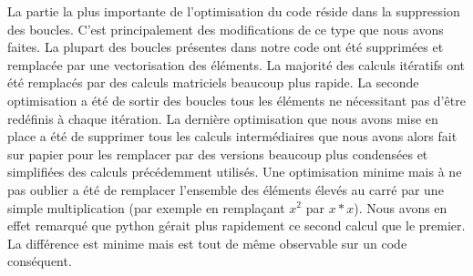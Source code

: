 \documentclass{article}
\begin{document}
		La partie la plus importante de l'optimisation du code réside dans la suppression des boucles. 
		C'est principalement des modifications de ce type que nous avons faites.
		La plupart des boucles présentes dans notre code ont été supprimées et remplacée par une vectorisation des éléments.
		La majorité des calculs itératifs ont été remplacés par des calculs matriciels beaucoup plus rapide.
		La seconde optimisation a été de sortir des boucles tous les éléments ne nécessitant pas d'être redéfinis à chaque itération.
		La dernière optimisation que nous avons mise en place a été de supprimer tous les calculs intermédiaires que nous avons alors fait sur papier pour les remplacer par des versions beaucoup plus condensées et simplifiées des calculs précédemment utilisés.
		Une optimisation minime mais à ne pas oublier a été de remplacer l'ensemble des éléments élevés au carré par une simple multiplication (par exemple en remplaçant $x^2$ par $x*x$).
		Nous avons en effet remarqué que python gérait plus rapidement ce second calcul que le premier.
		La différence est minime mais est tout de même observable sur un code conséquent.
\end{document}
